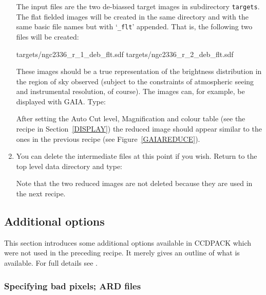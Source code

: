 \documentclass[twoside,11pt]{starlink}
\begin{document}
\begin{enumerate}
   The input files are the two de-biassed target images in subdirectory
   \texttt{targets}.  The flat fielded images will be created in the same
   directory and with the same basic file names but with `\texttt{\_flt}'
   appended.  That is, the following two files will be created:

\begin{terminalv}
targets/ngc2336_r_1_deb_flt.sdf
targets/ngc2336_r_2_deb_flt.sdf
\end{terminalv}

   These images should be a true representation of the brightness
   distribution in the region of sky observed (subject to the constraints
   of atmospheric seeing and instrumental resolution, of course).  The
   images can, for example, be displayed with GAIA.  Type:

\begin{terminalv}
\end{terminalv}

   After setting the \textsf{Auto Cut} level, \textsf{Magnification} and colour
   table (see the recipe in Section~\ref{DISPLAY}) the reduced image should
   appear similar to the ones in the previous recipe (see
   Figure~\ref{GAIAREDUCE}).

  \item You can delete the intermediate files at this point if you wish.
   Return to the top level data directory and type:

\begin{terminalv}
\end{terminalv}

   Note that the two reduced images are not deleted because they are used
   in the next recipe.

\end{enumerate}

\subsection{\label{ADDOPT}Additional options}

This section introduces some additional options available in CCDPACK
which were not used in the preceding recipe.  It merely gives an outline
of what is available.  For full details see
\/\cite{SUN139}.

\subsubsection{Specifying bad pixels; ARD files}
\end{document}
